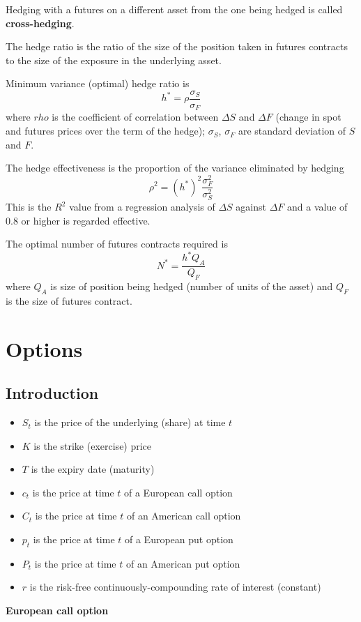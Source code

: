 \documentclass[11pt,a4paper]{book}
\theoremstyle{definition}\newtheorem{definition}{Definition}
\theoremstyle{definition}\newtheorem{fact}{Fact}
\theoremstyle{definition}\newtheorem{remark}{Remark}
\theoremstyle{definition}\newtheorem{ex}{Ex.}
\theoremstyle{definition}\newtheorem{project}{Project}
\theoremstyle{definition}\newtheorem{problem}{Problem}
\theoremstyle{definition}\newtheorem{example}{Example}
\numberwithin{theorem}{section}
\numberwithin{corollary}{chapter}
\numberwithin{assumption}{chapter}
\numberwithin{definition}{chapter}
\numberwithin{prop}{chapter}
\numberwithin{notation}{chapter}
\numberwithin{problem}{chapter}
\numberwithin{example}{chapter}
\numberwithin{fact}{chapter}
\numberwithin{ex}{chapter}
\begin{document}
Hedging with a futures on a different asset from the one being hedged is called \textbf{cross-hedging}.

The hedge ratio is the ratio of the size of the position taken in futures contracts to the size of the exposure in the underlying asset.

Minimum variance (optimal) hedge ratio is
$$ h^* = \rho \frac{\sigma_S}{\sigma_F} $$
where $rho$ is the coefficient of correlation between $\Delta S$ and $\Delta F$ (change in spot and futures prices over the term of the hedge); $\sigma_S$, $\sigma_F$ are standard deviation of $S$ and $F$.

The hedge effectiveness is the proportion of the variance eliminated by hedging
$$ \rho^2 = (h^*)^2 \frac{\sigma_F^2}{\sigma_S^2} $$
This is the $R^2$ value from a regression analysis of $\Delta S$ against $\Delta F$ and a value of 0.8 or higher is regarded effective.

The optimal number of futures contracts required is
$$ N^* = \frac{h^* Q_A}{Q_F} $$
where $Q_A$ is size of position being hedged (number of units of the asset) and $Q_F$ is the size of futures contract.

\section{Options}

\subsection{Introduction}
\begin{itemize}
\item $S_t$ is the price of the underlying (share) at time $t$
\item $K$ is the strike (exercise) price
\item $T$ is the expiry date (maturity)
\item $c_t$ is the price at time $t$ of a European call option
\item $C_t$ is the price at time $t$ of an American call option
\item $p_t$ is the price at time $t$ of a European put option
\item $P_t$ is the price at time $t$ of an American put option
\item $r$ is the risk-free continuously-compounding rate of interest (constant) 
\end{itemize}

\textbf{European call option}
\end{document}
